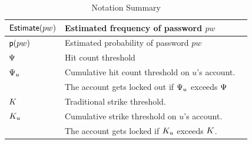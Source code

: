 \begin{table}[htb]
\begin{tabular}{|l|l|l|}
		$\textsf{Estimate}(pw)$ & Estimated frequency of password $pw$\\\hline
		
		$\textsf{p}(pw)$ & Estimated probability of password $pw$  \\\hline                    
		
		$\Psi$ & Hit count threshold \\\hline 
		
		$\Psi_{u}$ & Cumulative hit count threshold on $u$’s account. \\&The account gets locked out if $\Psi_{u}$ exceeds $\Psi$\\\hline
		
		$K$ & Traditional strike threshold. \\\hline
		
		$K_{u}$ & Cumulative strike threshold on $u$'s account. \\&The account gets locked if $K_{u}$ exceeds $K$. \\\hline
		
		
		
		
		
		
		
		
		
	\end{tabular}
	\vspace{-0.1cm}
	\caption{Notation Summary}\label{table: notation}
	\vspace{-0.2cm}
	
\end{table}
